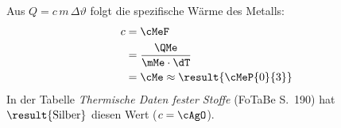 Aus $Q = c\,m\,\Delta\vartheta$ folgt die spezifische Wärme des Metalls:
\begin{align}
 c &= \cMeF \\
   &= \frac{\QMe}{\mMe\cdot\dT} \\
   &= \cMe \approx \result{\cMeP{0}{3}}
\end{align}
In der Tabelle \emph{Thermische Daten fester Stoffe} (FoTaBe S.~190) hat $\result{\text{Silber}}$ diesen Wert ($c = \cAgO$).

